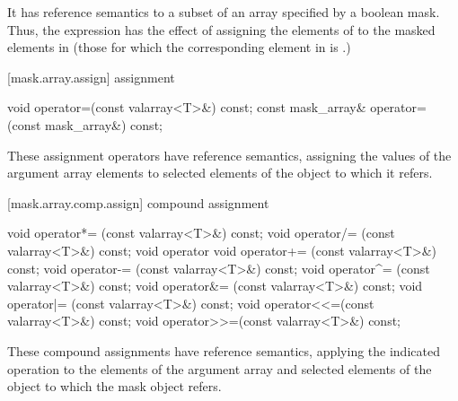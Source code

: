 \begin{itemdescr}
\pnum
It has reference semantics to a subset of an array specified by a boolean mask.
Thus, the expression
has the effect of assigning the elements of
to the masked
elements in
(those for which the corresponding element
in
is
.)
\end{itemdescr}

[mask.array.assign]{ assignment}

%
\begin{itemdecl}
void operator=(const valarray<T>&) const;
const mask_array& operator=(const mask_array&) const;
\end{itemdecl}

\begin{itemdescr}
\pnum
These assignment operators have reference semantics, assigning the values
of the argument array elements to selected elements of the
object to which it refers.
\end{itemdescr}

[mask.array.comp.assign]{ compound assignment}

%
%
%
%
%
%
%
%
%
%
\begin{itemdecl}
void operator*= (const valarray<T>&) const;
void operator/= (const valarray<T>&) const;
void operator%
void operator+= (const valarray<T>&) const;
void operator-= (const valarray<T>&) const;
void operator^= (const valarray<T>&) const;
void operator&= (const valarray<T>&) const;
void operator|= (const valarray<T>&) const;
void operator<<=(const valarray<T>&) const;
void operator>>=(const valarray<T>&) const;
\end{itemdecl}

\begin{itemdescr}
\pnum
These compound assignments have reference semantics, applying the
indicated operation to the elements of the argument array and selected elements
of the
object to which the mask object refers.
\end{itemdescr}

